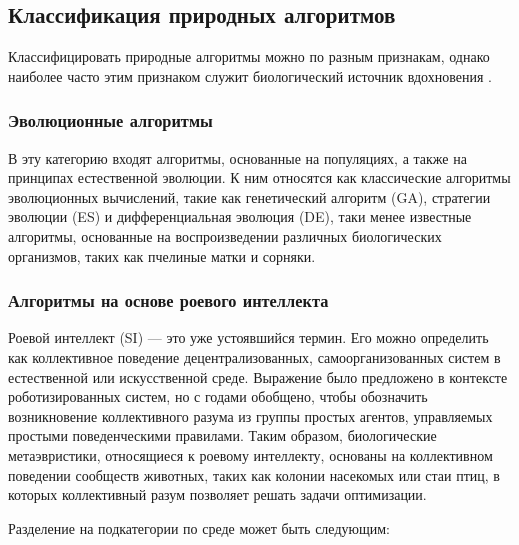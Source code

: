 \subsection{Классификация природных алгоритмов}

Классифицировать природные алгоритмы можно по разным признакам, однако наиболее
часто этим признаком служит биологический источник вдохновения \cite{BioInspiredTaxonomy}.

\subsubsection{Эволюционные алгоритмы}

В эту категорию входят алгоритмы, основанные на популяциях, а также
на принципах естественной эволюции. К ним относятся как
классические алгоритмы эволюционных вычислений, такие как генетический
алгоритм (GA), стратегии эволюции (ES) и дифференциальная эволюция (DE),
таки менее известные алгоритмы, основанные на воспроизведении
различных биологических организмов, таких как пчелиные матки и сорняки.

\subsubsection{Алгоритмы на основе роевого интеллекта}

Роевой интеллект (SI) — это уже устоявшийся термин. Его можно определить
как коллективное поведение децентрализованных, самоорганизованных систем в
естественной или искусственной среде. Выражение было предложено в контексте
роботизированных систем, но с годами обобщено, чтобы обозначить возникновение
коллективного разума из группы простых агентов, управляемых простыми поведенческими
правилами. Таким образом, биологические метаэвристики, относящиеся к роевому
интеллекту, основаны на коллективном поведении сообществ животных, таких как
колонии насекомых или стаи птиц, в которых коллективный разум позволяет решать
задачи оптимизации.

Разделение на подкатегории по среде может быть следующим:

